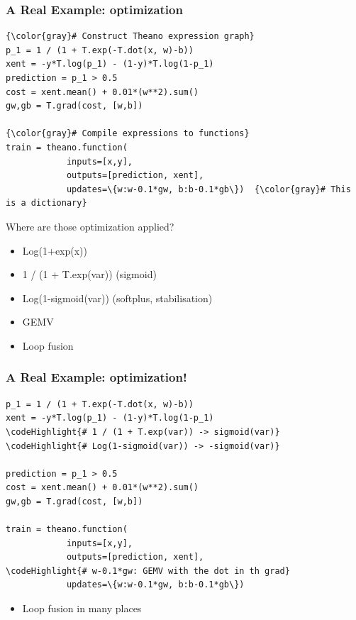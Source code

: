 \documentclass[a4paper,9pt]{beamer}
\begin{document}
\begin{frame}[fragile]
  \frametitle{A Real Example: optimization}
\begin{Verbatim}[commandchars=\\\{\}]
{\color{gray}# Construct Theano expression graph}
p_1 = 1 / (1 + T.exp(-T.dot(x, w)-b))
xent = -y*T.log(p_1) - (1-y)*T.log(1-p_1)
prediction = p_1 > 0.5
cost = xent.mean() + 0.01*(w**2).sum()
gw,gb = T.grad(cost, [w,b])

{\color{gray}# Compile expressions to functions}
train = theano.function(
            inputs=[x,y],
            outputs=[prediction, xent],
            updates=\{w:w-0.1*gw, b:b-0.1*gb\})  {\color{gray}# This is a dictionary}
\end{Verbatim}
Where are those optimization applied?
\begin{itemize}
\item Log(1+exp(x))
\item 1 / (1 + T.exp(var)) (sigmoid)
\item Log(1-sigmoid(var)) (softplus, stabilisation)
\item GEMV
\item Loop fusion
\end{itemize}
\end{frame}

\begin{frame}[fragile]
  \frametitle{A Real Example: optimization!}
\begin{Verbatim}[commandchars=\\\{\}]
p_1 = 1 / (1 + T.exp(-T.dot(x, w)-b))
xent = -y*T.log(p_1) - (1-y)*T.log(1-p_1)
\codeHighlight{# 1 / (1 + T.exp(var)) -> sigmoid(var)}
\codeHighlight{# Log(1-sigmoid(var)) -> -sigmoid(var)}

prediction = p_1 > 0.5
cost = xent.mean() + 0.01*(w**2).sum()
gw,gb = T.grad(cost, [w,b])

train = theano.function(
            inputs=[x,y],
            outputs=[prediction, xent],
\codeHighlight{# w-0.1*gw: GEMV with the dot in th grad}
            updates=\{w:w-0.1*gw, b:b-0.1*gb\})

\end{Verbatim}
\begin{itemize}
\item Loop fusion in many places
\end{itemize}
\end{frame}

\end{document}
